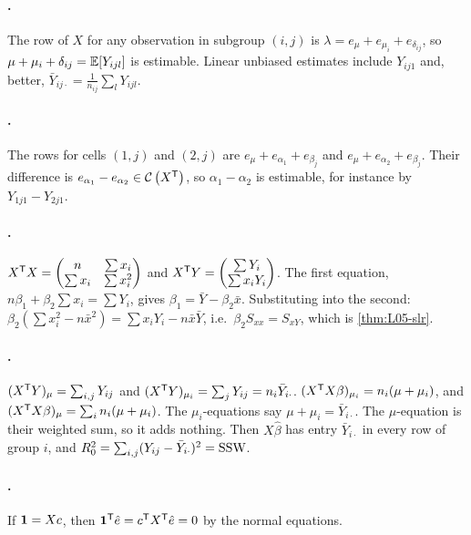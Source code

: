\paragraph{.}
The row of $X$ for any observation in subgroup $(i,j)$ is $\lambda=e_\mu+e_{\mu_i}+e_{\delta_{ij}}$, so
$\mu+\mu_i+\delta_{ij}=\mathbb E[Y_{ijl}]$ is estimable. Linear unbiased estimates include $Y_{ij1}$ and, better,
$\bar Y_{ij\cdot}=\frac1{n_{ij}}\sum_lY_{ijl}$.

\paragraph{.}
The rows for cells $(1,j)$ and $(2,j)$ are $e_\mu+e_{\alpha_1}+e_{\beta_j}$ and $e_\mu+e_{\alpha_2}+e_{\beta_j}$. Their difference
is $e_{\alpha_1}-e_{\alpha_2}\in\mathcal{C}\left(X^{\mathsf T}\right)$, so $\alpha_1-\alpha_2$ is estimable, for instance by $Y_{1j1}-Y_{2j1}$.

\paragraph{.}
$X^{\mathsf T} X=\begin{pmatrix}n&\sum x_i\\\sum x_i&\sum x_i^2\end{pmatrix}$ and $X^{\mathsf T} Y=\begin{pmatrix}\sum Y_i\\\sum x_iY_i\end{pmatrix}$.
The first equation, $n\beta_1+\beta_2\sum x_i=\sum Y_i$, gives $\beta_1=\bar Y-\beta_2\bar x$. Substituting into
the second: $\beta_2(\sum x_i^2-n\bar x^2)=\sum x_iY_i-n\bar x\bar Y$, i.e.\ $\beta_2S_{xx}=S_{xY}$, which is
\cref{thm:L05-slr}.

\paragraph{.}
$(X^{\mathsf T} Y)_\mu=\sum_{i,j}Y_{ij}$ and $(X^{\mathsf T} Y)_{\mu_i}=\sum_jY_{ij}=n_i\bar Y_{i\cdot}$. $(X^{\mathsf T} X\beta)_{\mu_i}=n_i(\mu+\mu_i)$, and
$(X^{\mathsf T} X\beta)_\mu=\sum_in_i(\mu+\mu_i)$. The $\mu_i$-equations say $\mu+\mu_i=\bar Y_{i\cdot}$. The $\mu$-equation is their
weighted sum, so it adds nothing. Then $X\hat\beta$ has entry $\bar Y_{i\cdot}$ in every row of group $i$, and
$R_0^2=\sum_{i,j}(Y_{ij}-\bar Y_{i\cdot})^2=\mathrm{SSW}$.

\paragraph{.}
If $\mathbf 1=Xc$, then $\mathbf 1^{\mathsf T}\hat e=c^{\mathsf T} X^{\mathsf T}\hat e=0$ by the normal equations.

